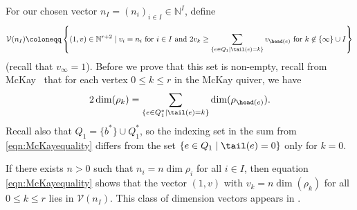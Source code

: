 For our chosen vector $n_I=(n_i)_{i \in I} \in \mathbb{N}^{I}$, define
 \[
\mathcal{V}(n_I) \coloneqq\left\{(1,v)\in \mathbb{N}^{r+2} \mid v_i = n_i \text{ for } i\in I \text{ and }2v_k \geq \sum_{\{e \in Q_1\mid \tail(e)=k\}} v_{\head(e)} \text{ for }k\not\in \{\infty\}\cup I \right\}
\]
 (recall that $v_\infty=1$). Before we prove that this set is non-empty, recall from McKay~\cite{McKay80} that for each vertex $0\leq k\leq r$ in the McKay quiver, we have
\begin{equation}
 \label{eqn:McKayequality}
2\dim(\rho_k) = \sum_{\{e\in Q_1^* \mid \tail(e)=k\}} \dim(\rho_{\head(e)}).
\end{equation}
Recall also that $Q_1=\{b^*\}\cup Q_1^*$, so the indexing set in the sum from \eqref{eqn:McKayequality} differs from the set $\{e \in Q_1\mid \tail(e)=0\}$ only for $k=0$.

\begin{Example}
\label{ex:ndeltaVnI}
If there exists $n>0$ such that $n_i = n\dim \rho_i$ for all $i\in I$, then equation \eqref{eqn:McKayequality} shows that the vector $(1,v)$ with $v_k =n\dim(\rho_k)$ for all $0\leq k\leq r$ lies in $\mathcal{V}(n_I)$. This class of dimension vectors appears in \cite{craw2019punctual}.
\end{Example}

